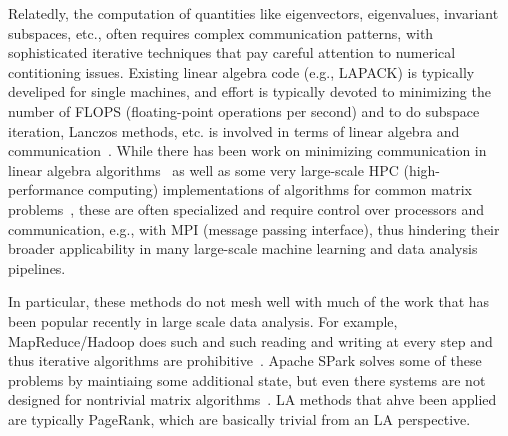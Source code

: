 Relatedly, the computation of quantities like eigenvectors, eigenvalues, invariant subspaces, etc., often requires complex communication patterns, with sophisticated iterative techniques that pay careful attention to numerical contitioning issues.
Existing linear algebra code (e.g., LAPACK) is typically develiped for single machines, and effort is typically devoted to minimizing the number of FLOPS (floating-point operations per second) and to do subspace iteration, Lanczos methods, etc. is involved in terms of linear algebra and communication~\cite{templates}.  
While there has been work on minimizing communication in linear algebra algorithms~\cite{BJHS11} as well as some very large-scale HPC (high-performance computing) implementations of algorithms for common matrix problems~\cite{XXX-WHAT-IS-A-GOOD-HPC-LA-REF-HERE}, these are often specialized and require control over processors and communication, e.g., with MPI (message passing interface), thus hindering their broader applicability in many large-scale machine learning and data analysis pipelines.


In particular, these methods do not mesh well with much of the work that has been popular recently in large scale data analysis.
For example, MapReduce/Hadoop does such and such reading and writing at every step and thus iterative algorithms are prohibitive~\cite{DG08_CACM}. 
Apache SPark solves some of these problems by maintiaing some additional state, but even there systems are not designed for nontrivial matrix algorithms~\cite{SPARK_NSDI_12}.
LA methods that ahve been applied are typically PageRank, which are basically trivial from an LA perspective.

